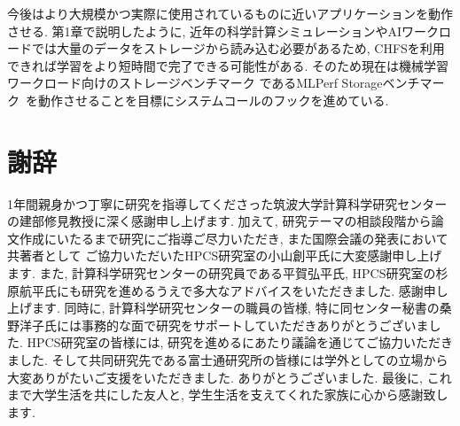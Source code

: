 \documentclass[a4paper,11pt]{jreport}
\begin{document}
今後はより大規模かつ実際に使用されているものに近いアプリケーションを動作させる. 
第1章で説明したように, 近年の科学計算シミュレーションやAIワークロードでは大量のデータをストレージから読み込む必要があるため, 
CHFSを利用できれば学習をより短時間で完了できる可能性がある. そのため現在は機械学習ワークロード向けのストレージベンチマーク
であるMLPerf Storageベンチマーク~\cite{mlperfstorage}を動作させることを目標にシステムコールのフックを進めている. 

\chapter*{謝辞}
1年間親身かつ丁寧に研究を指導してくださった筑波大学計算科学研究センターの建部修見教授に深く感謝申し上げます. 
加えて, 研究テーマの相談段階から論文作成にいたるまで研究にご指導ご尽力いただき, また国際会議の発表において共著者として
ご協力いただいたHPCS研究室の小山創平氏に大変感謝申し上げます. 
また, 計算科学研究センターの研究員である平賀弘平氏, HPCS研究室の杉原航平氏にも研究を進めるうえで多大なアドバイスをいただきました. 感謝申し上げます. 
同時に, 計算科学研究センターの職員の皆様, 特に同センター秘書の桑野洋子氏には事務的な面で研究をサポートしていただきありがとうございました. 
HPCS研究室の皆様には, 研究を進めるにあたり議論を通じてご協力いただきました. 
そして共同研究先である富士通研究所の皆様には学外としての立場から大変ありがたいご支援をいただきました. ありがとうございました. 
最後に, これまで大学生活を共にした友人と, 学生生活を支えてくれた家族に心から感謝致します. 

\newpage

\renewcommand{\bibname}{参考文献}



\end{document}
